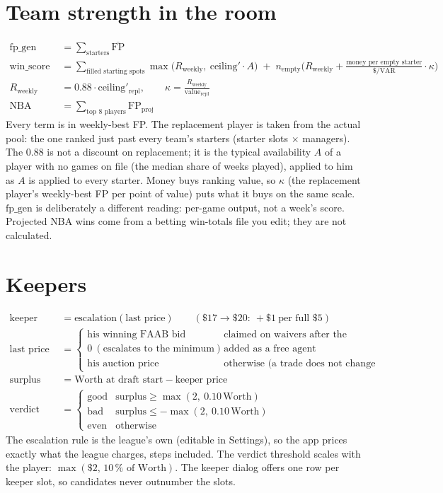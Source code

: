 \documentclass[10pt]{article}
\begin{document}
\section{Team strength in the room}
\begin{align}
\mathrm{fp\_gen} &= \sum_{\text{starters}}\overline{\mathrm{FP}}\\
\mathrm{win\_score} &= \sum_{\text{filled starting spots}}\max\!\big(R_{\text{weekly}},\ \text{ceiling}'\cdot A\big)\;+\;n_{\text{empty}}\Big(R_{\text{weekly}}+\frac{\text{money per empty starter}}{\$/\mathrm{VAR}}\cdot\kappa\Big)\\
R_{\text{weekly}} &= 0.88\cdot\text{ceiling}'_{\text{repl}},\qquad \kappa=\frac{R_{\text{weekly}}}{\text{value}_{\text{repl}}}\\
\text{NBA team talent} &= \sum_{\text{top 8 players}}\mathrm{FP}_{\text{proj}}
\end{align}
Every term is in weekly-best FP. The replacement player is taken from the actual pool: the one ranked just past every
team's starters (starter slots $\times$ managers). The $0.88$ is not a discount on replacement; it is the typical
availability $A$ of a player with no games on file (the median share of weeks played), applied to him as $A$ is applied
to every starter. Money buys ranking value, so $\kappa$ (the replacement player's weekly-best FP per point of value) puts
what it buys on the same scale. $\mathrm{fp\_gen}$ is deliberately a different reading: per-game output, not a week's score.
Projected NBA wins come from a betting win-totals file you edit; they are not calculated.

\section{Keepers}
\begin{align}
\text{keeper price} &= \text{escalation}(\text{last price})\qquad(\$17\to\$20:\ +\$1\ \text{per full }\$5)\\
\text{last price} &= \begin{cases}\text{his winning FAAB bid}&\text{claimed on waivers after the auction}\\ 0\ (\text{escalates to the minimum})&\text{added as a free agent}\\ \text{his auction price}&\text{otherwise (a trade does not change it)}\end{cases}\\
\text{surplus} &= \text{Worth at draft start}-\text{keeper price}\\
\text{verdict} &= \begin{cases}\text{good}&\text{surplus}\ge\max(2,\ 0.10\,\text{Worth})\\ \text{bad}&\text{surplus}\le-\max(2,\ 0.10\,\text{Worth})\\ \text{even}&\text{otherwise}\end{cases}
\end{align}
The escalation rule is the league's own (editable in Settings), so the app prices exactly what the league charges,
steps included. The verdict threshold scales with the player: $\max(\$2,\,10\,\%\text{ of Worth})$. The keeper dialog
offers one row per keeper slot, so candidates never outnumber the slots.
\end{document}
